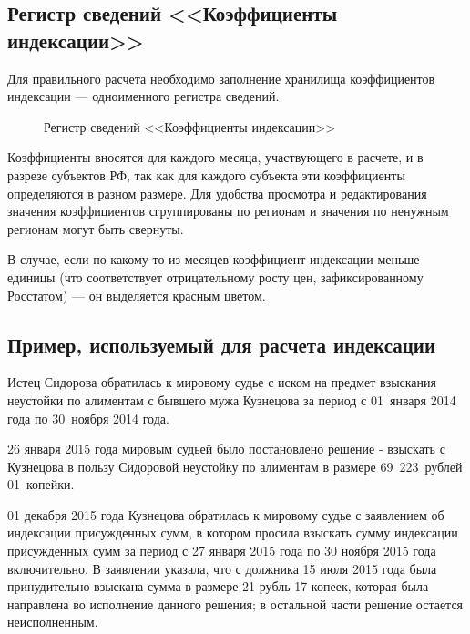 \documentclass[a4paper,12pt,draft]{article}
\begin{document}
\subsection{Регистр сведений <<Коэффициенты индексации>>}
\label{sec:rs_ind}
Для правильного расчета необходимо заполнение хранилища коэффициентов индексации --- одноименного регистра сведений.
\begin{figure}[h]
\caption{Регистр сведений <<Коэффициенты индексации>>}
\label{ris:ind7}
\end{figure}

Коэффициенты вносятся для каждого месяца, участвующего в расчете, и в разрезе субъектов РФ, так как для каждого субъекта эти коэффициенты определяются в разном размере. Для удобства просмотра и редактирования значения коэффициентов сгруппированы по регионам и значения по ненужным регионам могут быть свернуты.

В случае, если по какому-то из месяцев коэффициент индексации меньше единицы (что соответствует отрицательному росту цен, зафиксированному Росстатом) --- он выделяется красным цветом.
\subsection{Пример, используемый для расчета индексации}
Истец Сидорова обратилась к мировому судье с иском на предмет взыскания не\-ус\-тойки по алиментам с бывшего мужа Кузнецова за период с 01~января 2014 года по 30~ноября 2014 года.

26 января 2015 года мировым судьей было постановлено решение - взыскать с Кузнецова в пользу Сидоровой неустойку по алиментам в размере 69~223~рублей 01~копейки.

01 декабря 2015 года Кузнецова обратилась к мировому судье с заявлением об индексации присужденных сумм, в котором просила взыскать сумму индексации присужденных сумм за период с 27 января 2015 года по 30 ноября 2015 года включительно. В заявлении указала, что с должника 15 июля 2015 года была принудительно взыскана сумма в размере 21 рубль 17 копеек, которая была направлена во исполнение данного решения; в остальной части решение остается неисполненным.
\end{document}
